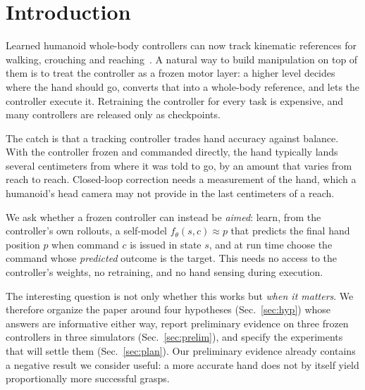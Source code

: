 \documentclass[conference]{IEEEtran}
\begin{document}
\IEEEpeerreviewmaketitle

\section{Introduction}

Learned humanoid whole-body controllers can now track kinematic references for walking, crouching and reaching~\cite{scalebfm,sonic,heft,amo,gr00twbc}. A natural way to build manipulation on top of them is to treat the controller as a frozen motor layer: a higher level decides where the hand should go, converts that into a whole-body reference, and lets the controller execute it. Retraining the controller for every task is expensive, and many controllers are released only as checkpoints.

The catch is that a tracking controller trades hand accuracy against balance. With the controller frozen and commanded directly, the hand typically lands several centimeters from where it was told to go, by an amount that varies from reach to reach. Closed-loop correction needs a measurement of the hand, which a humanoid's head camera may not provide in the last centimeters of a reach.

We ask whether a frozen controller can instead be \emph{aimed}: learn, from the controller's own rollouts, a self-model $f_\theta(s,c)\approx p$ that predicts the final hand position $p$ when command $c$ is issued in state $s$, and at run time choose the command whose \emph{predicted} outcome is the target. This needs no access to the controller's weights, no retraining, and no hand sensing during execution.

The interesting question is not only whether this works but \emph{when it matters}. We therefore organize the paper around four hypotheses (Sec.~\ref{sec:hyp}) whose answers are informative either way, report preliminary evidence on three frozen controllers in three simulators (Sec.~\ref{sec:prelim}), and specify the experiments that will settle them (Sec.~\ref{sec:plan}). Our preliminary evidence already contains a negative result we consider useful: a more accurate hand does not by itself yield proportionally more successful grasps.

\end{document}
